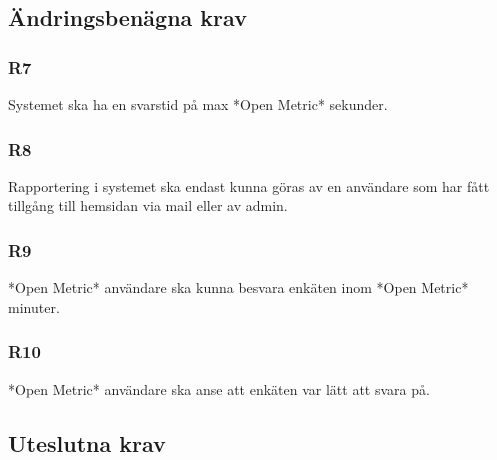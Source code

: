 \documentclass{article}
\begin{document}
     \subsection*{Ändringsbenägna krav}
     
     \subsubsection*{R7}
    Systemet ska ha en svarstid på max *Open Metric* sekunder.
    
    \subsubsection*{R8}
    Rapportering i systemet ska endast kunna göras av en användare som har fått tillgång till hemsidan via mail eller av admin.
    
     \subsubsection*{R9}
    *Open Metric* användare ska kunna besvara enkäten inom *Open Metric* minuter.
    
    \subsubsection*{R10}
    *Open Metric* användare ska anse att enkäten var lätt att svara på.
    
    \subsection*{Uteslutna krav}

\end{document}
